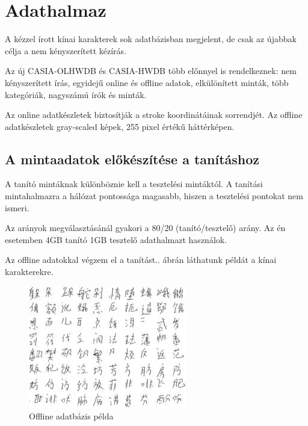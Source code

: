 
\section{Adathalmaz}

A kézzel írott kínai karakterek sok adatbázisban megjelent, de csak az újabbak célja a nem kényszerített kézírás.

Az új CASIA-OLHWDB és CASIA-HWDB több előnnyel is rendelkeznek: nem kényszerített írás, egyidejű online és offline adatok, elkülönített minták, több kategóriák, nagyszámú írók és minták.

Az online adatkészletek biztosítják a stroke koordinátáinak sorrendjét. Az offline adatkészletek gray-scaled képek, 255 pixel értékű háttérképen.

\subsection{A mintaadatok előkészítése a tanításhoz}

A tanító mintáknak különböznie kell a tesztelési mintáktól. A tanítási mintahalmazra a hálózat pontossága magasabb, hiszen a tesztelési pontokat nem ismeri.

Az arányok megválasztásánál gyakori a 80/20 (tanító/tesztelő) arány. Az én esetemben 4GB tanító 1GB tesztelő adathalmazt használok.

Az offline adatokkal végzem el a tanítást.. ábrán láthatunk példát a kínai karakterekre.

\begin{figure}[h]
	\centering
	\includegraphics[scale=2.0]{images/offline_dataset}
	\caption{Offline adatbázis példa}
	\label{fig:offline_dataset}
\end{figure} 

